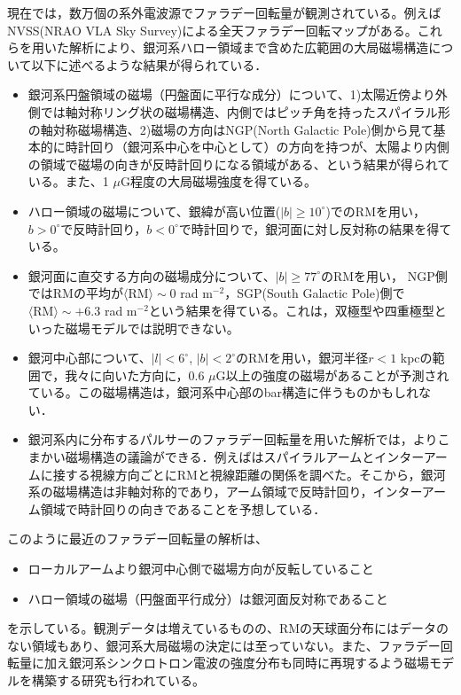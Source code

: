 現在では，数万個の系外電波源でファラデー回転量が観測されている。例えばNVSS(NRAO VLA Sky Survey)による全天ファラデー回転マップがある\citep{TSS2009}。これらを用いた解析により、銀河系ハロー領域まで含めた広範囲の大局磁場構造について以下に述べるような結果が得られている．
\begin{itemize}
\item 銀河系円盤領域の磁場（円盤面に平行な成分）について、1)太陽近傍より外側では軸対称リング状の磁場構造、内側ではピッチ角を持ったスパイラル形の軸対称磁場構造、2)磁場の方向はNGP(North Galactic Pole)側から見て基本的に時計回り（銀河系中心を中心として）の方向を持つが、太陽より内側の領域で磁場の向きが反時計回りになる領域がある、という結果が得られている\citep{VE2011}。また、1 $\mu$G程度の大局磁場強度を得ている。
\item ハロー領域の磁場について、銀緯が高い位置($|b| \ge 10^{\circ}$)でのRMを用い，$b > 0^{\circ}$で反時計回り，$b < 0^{\circ}$で時計回りで，銀河面に対し反対称の結果を得ている\citep{PTKN2011}。
\item 銀河面に直交する方向の磁場成分について、$|b| \ge 77^{\circ}$のRMを用い，
NGP側ではRMの平均が$\langle \textrm{RM} \rangle \sim 0$ rad m$^{-2}$，SGP(South Galactic Pole)側で$\langle \textrm{RM} \rangle \sim +6.3$ rad m$^{-2}$という結果を得ている\citep{MAO2010}。これは，双極型や四重極型といった磁場モデルでは説明できない。
\item 銀河中心部について、$|l| < 6^\circ$, $|b| < 2^\circ$のRMを用い，銀河半径$r < 1$ kpcの範囲で，我々に向いた方向に，0.6 $\mu$G以上の強度の磁場があることが予測されている\citep{PPS2008}。この磁場構造は，銀河系中心部のbar構造に伴うものかもしれない．
\item 銀河系内に分布するパルサーのファラデー回転量を用いた解析では，よりこまかい磁場構造の議論ができる．例えば\cite{HAN2006}はスパイラルアームとインターアームに接する視線方向ごとにRMと視線距離の関係を調べた。そこから，銀河系の磁場構造は非軸対称的であり，アーム領域で反時計回り，インターアーム領域で時計回りの向きであることを予想している．
\end{itemize}
このように最近のファラデー回転量の解析は、
\begin{itemize}
\item ローカルアームより銀河中心側で磁場方向が反転していること
\item ハロー領域の磁場（円盤面平行成分）は銀河面反対称であること
\end{itemize}
を示している。観測データは増えているものの、RMの天球面分布にはデータのない領域もあり、銀河系大局磁場の決定には至っていない。また、ファラデー回転量に加え銀河系シンクロトロン電波の強度分布も同時に再現するよう磁場モデルを構築する研究も行われている\citep{SUN2008,JAFFE2010,JANSSON2012}。

